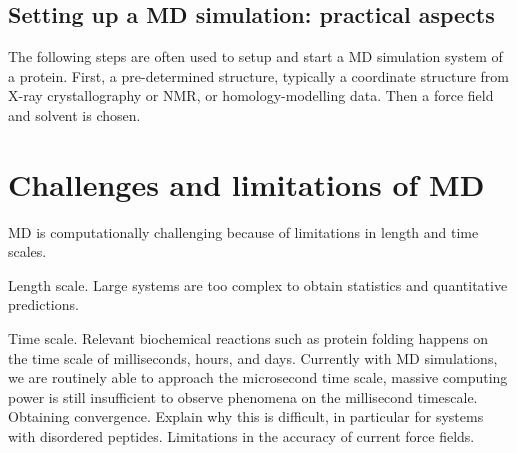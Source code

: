 
\subsection{Setting up a MD simulation: practical aspects}

The following steps are often used to setup and start a MD simulation system of a protein. First, a pre-determined structure, typically a coordinate structure from X-ray crystallography or NMR, or homology-modelling data. Then a force field and solvent is chosen.

\section{Challenges and limitations of MD}

\begin{outline}
	\1 MD is computationally challenging because of limitations in length and time scales.
	
		\2 Length scale. Large systems are too complex to obtain statistics and quantitative predictions.
			
		\2 Time scale. Relevant biochemical reactions such as protein folding happens on the time scale of milliseconds, hours, and days. Currently with MD simulations, we are routinely able to approach the microsecond time scale, massive computing power is still insufficient to observe phenomena on the millisecond timescale. %
		\2 Obtaining convergence. Explain why this is difficult, in particular for systems with disordered peptides.
	\1 Limitations in the accuracy of current force fields.
\end{outline}		

